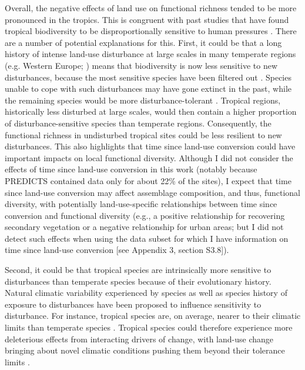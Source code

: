 Overall, the negative effects of land use on functional richness tended to be more pronounced in the tropics. This is congruent with past studies that have found tropical biodiversity to be disproportionally sensitive to human pressures \citep{Newbold2020, Martins2017}. There are a number of potential explanations for this. First, it could be that a long history of intense land-use disturbance at large scales in many temperate regions (e.g. Western Europe; \citet{Stephens2019}) means that biodiversity is now less sensitive to new disturbances, because the most sensitive species have been filtered out \citep{Balmford1996, Krauss2010, LeProvost2020, Munteanu2020}. Species unable to cope with such disturbances may have gone extinct in the past, while the remaining species would be more disturbance-tolerant \citep{Betts2019}. Tropical regions, historically less disturbed at large scales, would then contain a higher proportion of disturbance-sensitive species than temperate regions. Consequently, the functional richness in undisturbed tropical sites could be less resilient to new disturbances. This also highlights that time since land-use conversion could have important impacts on local functional diversity. Although I did not consider the effects of time since land-use conversion in this work (notably because PREDICTS contained data only for about 22\% of the sites), I expect that time since land-use conversion may affect assemblage composition, and thus, functional diversity, with potentially land-use-specific relationships between time since conversion and functional diversity (e.g., a positive relationship for recovering secondary vegetation or a negative relationship for urban areas; but I did not detect such effects when using the data subset for which I have information on time since land-use conversion [see Appendix 3, section S3.8]).

Second, it could be that tropical species are intrinsically more sensitive to disturbances than temperate species because of their evolutionary history. Natural climatic variability experienced by species as well as species history of exposure to disturbances have been proposed to influence sensitivity to disturbance. For instance, tropical species are, on average, nearer to their climatic limits than temperate species \citep{Deutsch2008, Sunday2014a}. Tropical species could therefore experience more deleterious effects from interacting drivers of change, with land-use change bringing about novel climatic conditions pushing them beyond their tolerance limits \citep{Frishkoff2016, Williams2020a}.

